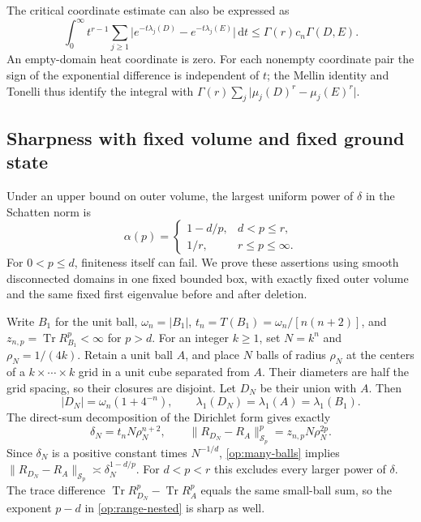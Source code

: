 \documentclass[11pt,reqno]{amsart}
\numberwithin{equation}{section}
\newcommand{\dd}{\,\mathrm d}
\newcommand{\abs}[1]{\lvert#1\rvert}
\newcommand{\norm}[1]{\lVert#1\rVert}
\DeclareMathOperator{\Tr}{Tr}
\begin{document}
The critical coordinate estimate can also be expressed as
\begin{equation}\label{op:integrated-heat-distance}
 \int_0^\infty t^{r-1}\sum_{j\ge1}
       \abs{e^{-t\lambda_j(D)}-e^{-t\lambda_j(E)}}\dd t
 \le\Gamma(r)c_n\Gamma(D,E).
\end{equation}
An empty-domain heat coordinate is zero.  For each nonempty
coordinate pair the sign of the exponential difference is
independent of $t$; the Mellin identity and Tonelli thus identify
the integral with $\Gamma(r)\sum_j\abs{\mu_j(D)^r-\mu_j(E)^r}$.

\subsection{Sharpness with fixed volume and fixed ground state}
\label{op:sharpness}

Under an upper bound on outer volume, the largest uniform power of
$\delta$ in the Schatten norm is
\begin{equation}\label{op:optimal-exponents}
 \alpha(p)=
 \begin{cases}
  1-d/p,&d<p\le r,\\
  1/r,&r\le p\le\infty.
 \end{cases}
\end{equation}
For $0<p\le d$, finiteness itself can fail.  We prove these assertions
using smooth disconnected domains in one fixed bounded box, with
exactly fixed outer volume and the same fixed first eigenvalue
before and after deletion.

Write $B_1$ for the unit ball,
$\omega_n=\abs{B_1}$, $t_n=T(B_1)=\omega_n/[n(n+2)]$, and
$z_{n,p}=\Tr R_{B_1}^p<\infty$ for $p>d$.
For an integer $k\ge1$, set $N=k^n$ and $\rho_N=1/(4k)$.
Retain a unit ball $A$, and place $N$ balls of radius $\rho_N$
at the centers of a $k\times\cdots\times k$ grid in a unit cube
separated from $A$.  Their diameters are half the grid spacing, so
their closures are disjoint.  Let $D_N$ be their union with $A$.
Then
\[
 \abs{D_N}=\omega_n(1+4^{-n}),\qquad
 \lambda_1(D_N)=\lambda_1(A)=\lambda_1(B_1).
\]
The direct-sum decomposition of the Dirichlet form gives exactly
\begin{equation}\label{op:many-balls}
 \delta_N=t_nN\rho_N^{n+2},\qquad
 \norm{R_{D_N}-R_A}_{\mathcal S_p}^p
       =z_{n,p}N\rho_N^{2p}.
\end{equation}
Since $\delta_N$ is a positive constant times $N^{-1/d}$,
\eqref{op:many-balls} implies
$\norm{R_{D_N}-R_A}_{\mathcal S_p}
 \asymp\delta_N^{1-d/p}$.
For $d<p<r$ this excludes every larger power of $\delta$.
The trace difference $\Tr R_{D_N}^p-\Tr R_A^p$ equals the same
small-ball sum, so the exponent $p-d$ in
\eqref{op:range-nested} is sharp as well.
\end{document}
